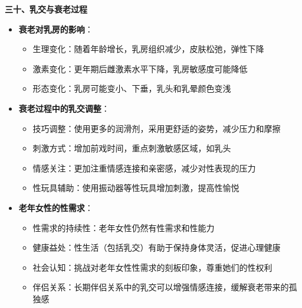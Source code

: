 \documentclass[12pt,UTF8]{ctexbook}
\begin{document}
  \textbf{三十、乳交与衰老过程}
  \begin{itemize}
  \item \textbf{衰老对乳房的影响}：
    \begin{itemize}
    \item 生理变化：随着年龄增长，乳房组织减少，皮肤松弛，弹性下降
    \item 激素变化：更年期后雌激素水平下降，乳房敏感度可能降低
    \item 形态变化：乳房可能变小、下垂，乳头和乳晕颜色变浅
    \end{itemize}
  \item \textbf{衰老过程中的乳交调整}：
    \begin{itemize}
    \item 技巧调整：使用更多的润滑剂，采用更舒适的姿势，减少压力和摩擦
    \item 刺激方式：增加前戏时间，重点刺激敏感区域，如乳头
    \item 情感关注：更加注重情感连接和亲密感，减少对性表现的压力
    \item 性玩具辅助：使用振动器等性玩具增加刺激，提高性愉悦
    \end{itemize}
  \item \textbf{老年女性的性需求}：
    \begin{itemize}
    \item 性需求的持续性：老年女性仍然有性需求和性能力
    \item 健康益处：性生活（包括乳交）有助于保持身体灵活，促进心理健康
    \item 社会认知：挑战对老年女性性需求的刻板印象，尊重她们的性权利
    \item 伴侣关系：长期伴侣关系中的乳交可以增强情感连接，缓解衰老带来的孤独感
    \end{itemize}
  \end{itemize}
\end{document}

